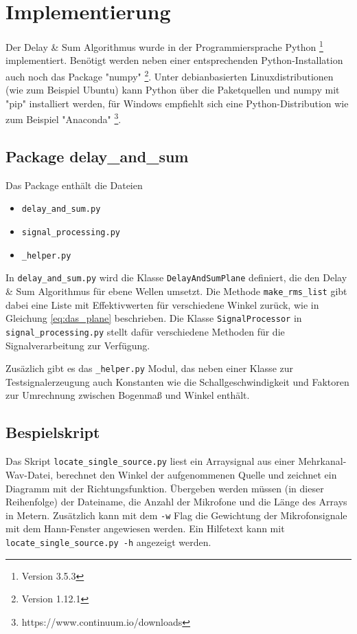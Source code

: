 \section{Implementierung}
	
	Der Delay \& Sum Algorithmus wurde in der Programmiersprache Python \footnote{Version 3.5.3} implementiert. Benötigt werden neben einer entsprechenden Python-Installation auch noch das Package "numpy" \footnote{Version 1.12.1}. Unter debianbasierten Linuxdistributionen (wie zum Beispiel Ubuntu) kann Python über die Paketquellen und numpy mit "pip" installiert werden, für Windows empfiehlt sich eine Python-Distribution wie zum Beispiel "Anaconda" \footnote{https://www.continuum.io/downloads}.
	
	\subsection{Package delay\_and\_sum}
	
	Das Package enthält die Dateien
	\begin{itemize}
		\item \texttt{delay\_and\_sum.py}
		\item \texttt{signal\_processing.py}
		\item \texttt{\_helper.py}
	\end{itemize}
	In \texttt{delay\_and\_sum.py} wird die Klasse \texttt{DelayAndSumPlane} definiert, die den Delay \& Sum Algorithmus für ebene Wellen umsetzt. Die Methode \texttt{make\_rms\_list} gibt dabei eine Liste mit Effektivwerten für verschiedene Winkel zurück, wie in Gleichung \ref{eq:das_plane} beschrieben.
	Die Klasse \texttt{SignalProcessor} in \texttt{signal\_processing.py} stellt dafür verschiedene Methoden für die Signalverarbeitung zur Verfügung.
	
	Zusäzlich gibt es das \texttt{\_helper.py} Modul, das neben einer Klasse zur Testsignalerzeugung auch Konstanten wie die Schallgeschwindigkeit und Faktoren zur Umrechnung zwischen Bogenmaß und Winkel enthält.
	
\subsection{Bespielskript}

	Das Skript \texttt{locate\_single\_source.py} liest ein Arraysignal aus einer Mehrkanal-Wav-Datei, berechnet den Winkel der aufgenommenen Quelle und zeichnet ein Diagramm mit der Richtungsfunktion.
	Übergeben werden müssen (in dieser Reihenfolge) der Dateiname, die Anzahl der Mikrofone und die Länge des Arrays in Metern. Zusätzlich kann mit dem \texttt{-w} Flag die Gewichtung der Mikrofonsignale mit dem Hann-Fenster angewiesen werden.
	Ein Hilfetext kann mit \texttt{locate\_single\_source.py -h} angezeigt werden.